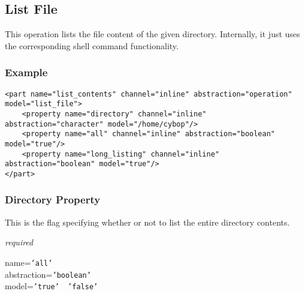 %
%
%
%
%
%

\subsection{List File}
\label{list_file_heading}

This operation lists the file content of the given directory. Internally, it
just uses the corresponding shell command functionality.

\subsubsection{Example}

\begin{scriptsize}
    \begin{verbatim}
<part name="list_contents" channel="inline" abstraction="operation" model="list_file">
    <property name="directory" channel="inline" abstraction="character" model="/home/cybop"/>
    <property name="all" channel="inline" abstraction="boolean" model="true"/>
    <property name="long_listing" channel="inline" abstraction="boolean" model="true"/>
</part>
    \end{verbatim}
\end{scriptsize}

\subsubsection{Directory Property}

This is the flag specifying whether or not to list the entire directory contents.

\emph{required}

name=\texttt{'all'}\\
abstraction=\texttt{'boolean'}\\
model=\texttt{'true' \vline\ 'false'}

